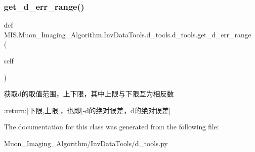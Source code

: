 \subsubsection{\texorpdfstring{get\+\_\+d\+\_\+err\+\_\+range()}{get\_d\_err\_range()}}
{\footnotesize\ttfamily def M\+I\+S.\+Muon\+\_\+\+Imaging\+\_\+\+Algorithm.\+Inv\+Data\+Tools.\+d\+\_\+tools.\+d\+\_\+tools.\+get\+\_\+d\+\_\+err\+\_\+range (\begin{DoxyParamCaption}\item[{}]{self }\end{DoxyParamCaption})}

\begin{DoxyVerb}获取d的取值范围，上下限，其中上限与下限互为相反数

:return:[下限,上限]，也即[-d的绝对误差，d的绝对误差]
\end{DoxyVerb}
 

The documentation for this class was generated from the following file\+:\begin{DoxyCompactItemize}
\item 
Muon\+\_\+\+Imaging\+\_\+\+Algorithm/\+Inv\+Data\+Tools/d\+\_\+tools.\+py\end{DoxyCompactItemize}
